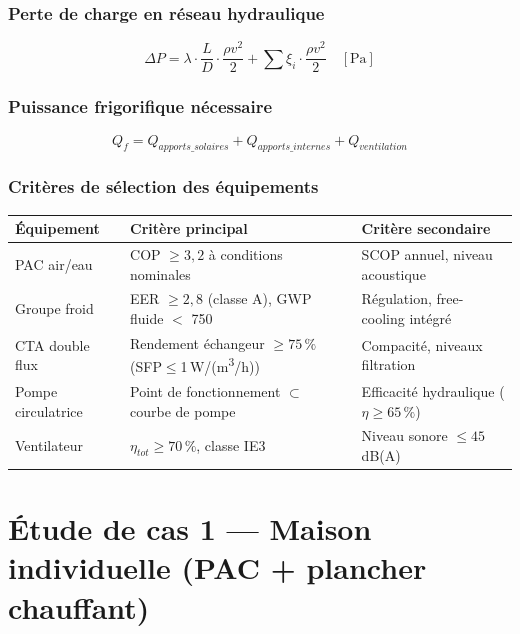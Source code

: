 \subsubsection{Perte de charge en réseau hydraulique}

\begin{equation}
  \Delta P = \lambda \cdot \frac{L}{D} \cdot \frac{\rho v^2}{2} + \sum \xi_i \cdot \frac{\rho v^2}{2} \quad [\si{\pascal}]
\end{equation}

\subsubsection{Puissance frigorifique nécessaire}

\begin{equation}
  Q_f = Q_{apports\_solaires} + Q_{apports\_internes} + Q_{ventilation}
\end{equation}

\subsubsection{Critères de sélection des équipements}

\begin{center}
\begin{tabular}{lll}
  \toprule
  Équipement & Critère principal & Critère secondaire \\
  \midrule
  PAC air/eau & COP $\geq 3{,}2$ à conditions nominales & SCOP annuel, niveau acoustique \\
  Groupe froid & EER $\geq 2{,}8$ (classe A), GWP fluide $<$ 750 & Régulation, free-cooling intégré \\
  CTA double flux & Rendement échangeur $\geq 75\,\%$ (SFP$\leq$1\,W/(m\textsuperscript{3}/h)) & Compacité, niveaux filtration \\
  Pompe circulatrice & Point de fonctionnement $\subset$ courbe de pompe & Efficacité hydraulique ($\eta \geq 65\,\%$) \\
  Ventilateur & $\eta_{tot} \geq 70\,\%$, classe IE3 & Niveau sonore $\leq 45$ dB(A) \\
  \bottomrule
\end{tabular}
\end{center}

\section{Étude de cas 1 — Maison individuelle (PAC + plancher chauffant)}

